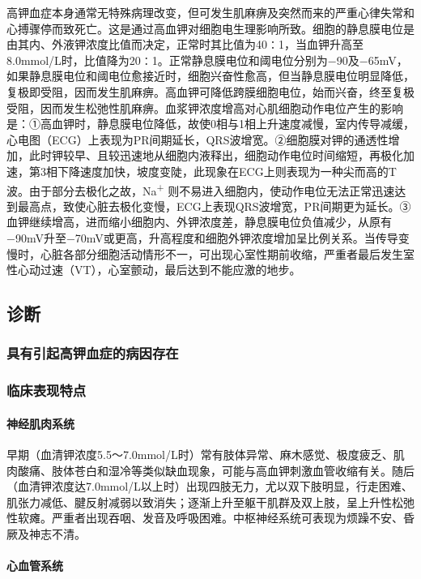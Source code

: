 高钾血症本身通常无特殊病理改变，但可发生肌麻痹及突然而来的严重心律失常和心搏骤停而致死亡。这是通过高血钾对细胞电生理影响所致。细胞的静息膜电位是由其内、外液钾浓度比值而决定，正常时其比值为40∶1，当血钾升高至8.0mmol/L时，比值降为20∶1。正常静息膜电位和阈电位分别为−90及−65mV，如果静息膜电位和阈电位愈接近时，细胞兴奋性愈高，但当静息膜电位明显降低，复极即受阻，因而发生肌麻痹。高血钾可降低跨膜细胞电位，始而兴奋，终至复极受阻，因而发生松弛性肌麻痹。血浆钾浓度增高对心肌细胞动作电位产生的影响是：①高血钾时，静息膜电位降低，故使0相与1相上升速度减慢，室内传导减缓，心电图（ECG）上表现为PR间期延长，QRS波增宽。②细胞膜对钾的通透性增加，此时钾较早、且较迅速地从细胞内液释出，细胞动作电位时间缩短，再极化加速，第3相下降速度加快，坡度变陡，此现象在ECG上则表现为一种尖而高的T波。由于部分去极化之故，Na\textsuperscript{+}
则不易进入细胞内，使动作电位无法正常迅速达到最高点，致使心脏去极化变慢，ECG上表现QRS波增宽，PR间期更为延长。③血钾继续增高，进而缩小细胞内、外钾浓度差，静息膜电位负值减少，从原有−90mV升至−70mV或更高，升高程度和细胞外钾浓度增加呈比例关系。当传导变慢时，心脏各部分细胞活动情形不一，可出现心室性期前收缩，严重者最后发生室性心动过速（VT），心室颤动，最后达到不能应激的地步。

\subsection{诊断}

\subsubsection{具有引起高钾血症的病因存在}

\subsubsection{临床表现特点}

\paragraph{神经肌肉系统}

早期（血清钾浓度5.5～7.0mmol/L时）常有肢体异常、麻木感觉、极度疲乏、肌肉酸痛、肢体苍白和湿冷等类似缺血现象，可能与高血钾刺激血管收缩有关。随后（血清钾浓度达7.0mmol/L以上时）出现四肢无力，尤以双下肢明显，行走困难、肌张力减低、腱反射减弱以致消失；逐渐上升至躯干肌群及双上肢，呈上升性松弛性软瘫。严重者出现吞咽、发音及呼吸困难。中枢神经系统可表现为烦躁不安、昏厥及神志不清。

\paragraph{心血管系统}

